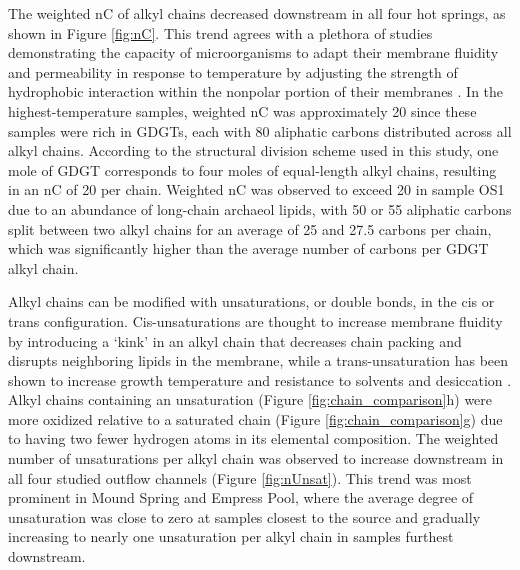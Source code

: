 The weighted nC of alkyl chains decreased downstream in all four hot springs, as shown in Figure \ref{fig:nC}. This trend agrees with a plethora of studies demonstrating the capacity of microorganisms to adapt their membrane fluidity and permeability in response to temperature by adjusting the strength of hydrophobic interaction within the nonpolar portion of their membranes \citep[see review by][]{van2008membrane}. In the highest-temperature samples, weighted nC was approximately 20 since these samples were rich in GDGTs, each with 80 aliphatic carbons distributed across all alkyl chains. According to the structural division scheme used in this study, one mole of GDGT corresponds to four moles of equal-length alkyl chains, resulting in an nC of 20 per chain. Weighted nC was observed to exceed 20 in sample OS1 due to an abundance of long-chain archaeol lipids, with 50 or 55 aliphatic carbons split between two alkyl chains for an average of 25 and 27.5 carbons per chain, which was significantly higher than the average number of carbons per GDGT alkyl chain.



Alkyl chains can be modified with unsaturations, or double bonds, in the cis or trans configuration. Cis-unsaturations are thought to increase membrane fluidity by introducing a `kink' in an alkyl chain that decreases chain packing and disrupts neighboring lipids in the membrane, while a trans-unsaturation has been shown to increase growth temperature \citep{kiran2005cis} and resistance to solvents and desiccation \citep{halverson2000differential}. Alkyl chains containing an unsaturation (Figure \ref{fig:chain_comparison}h) were more oxidized relative to a saturated chain (Figure \ref{fig:chain_comparison}g) due to having two fewer hydrogen atoms in its elemental composition. The weighted number of unsaturations per alkyl chain was observed to increase downstream in all four studied outflow channels (Figure \ref{fig:nUnsat}). This trend was most prominent in Mound Spring and Empress Pool, where the average degree of unsaturation was close to zero at samples closest to the source and gradually increasing to nearly one unsaturation per alkyl chain in samples furthest downstream.

